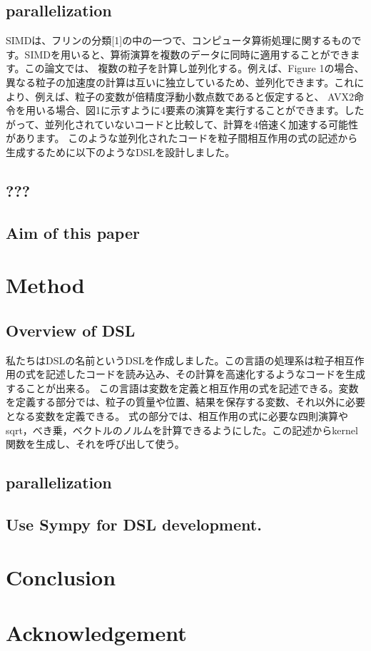 \documentclass[twocolumn, a4j]{article}
\begin{document}
\subsection{parallelization}
SIMDは、フリンの分類[1]の中の一つで、コンピュータ算術処理に関するものです。SIMDを用いると、算術演算を複数のデータに同時に適用することができます。この論文では、
複数の粒子を計算し並列化する。例えば、Figure 1の場合、
異なる粒子の加速度の計算は互いに独立しているため、並列化できます。これにより、例えば、粒子の変数が倍精度浮動小数点数であると仮定すると、
AVX2命令を用いる場合、図1に示すように4要素の演算を実行することができます。したがって、並列化されていないコードと比較して、計算を4倍速く加速する可能性があります。
このような並列化されたコードを粒子間相互作用の式の記述から生成するために以下のようなDSLを設計しました。
\subsection{???}


\subsection{Aim of this paper}

\section{Method}
\subsection{Overview of DSL}
私たちはDSLの名前というDSLを作成しました。この言語の処理系は粒子相互作用の式を記述したコードを読み込み、その計算を高速化するようなコードを生成することが出来る。
この言語は変数を定義と相互作用の式を記述できる。変数を定義する部分では、粒子の質量や位置、結果を保存する変数、それ以外に必要となる変数を定義できる。
式の部分では、相互作用の式に必要な四則演算やsqrt，べき乗，ベクトルのノルムを計算できるようにした。この記述からkernel関数を生成し、それを呼び出して使う。
\subsection{parallelization}


\subsection{Use Sympy for DSL development.}

\section{Conclusion}
\section{Acknowledgement}

\end{document}
